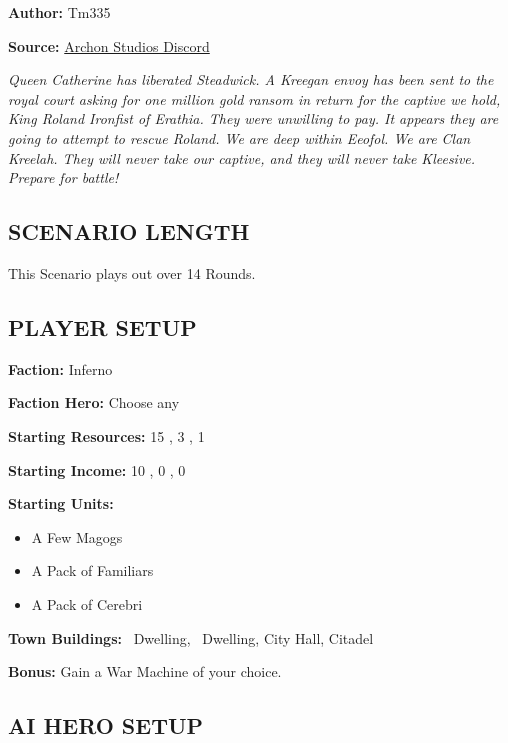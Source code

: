 
\begin{multicols}{2}

\textbf{Author:} Tm335

\textbf{Source:} \href{https://discord.com/channels/740870068178649108/1253923753981902939/1253923753981902939}{Archon Studios Discord}

\textit{Queen Catherine has liberated Steadwick.
A Kreegan envoy has been sent to the royal court asking for one million gold ransom in return for the captive we hold, King Roland Ironfist of Erathia.
They were unwilling to pay.
It appears they are going to attempt to rescue Roland.
We are deep within Eeofol.
We are Clan Kreelah.
They will never take our captive, and they will never take Kleesive.
Prepare for battle!}

\subsection*{\MakeUppercase{Scenario Length}}

This Scenario plays out over 14 Rounds.

\subsection*{\MakeUppercase{Player Setup}}

\textbf{Faction:} Inferno

\textbf{Faction Hero:} Choose any

\textbf{Starting Resources:} 15 , 3 , 1 

\textbf{Starting Income:} 10 , 0 , 0 

\textbf{Starting Units:}

\begin{itemize}
  \item A Few Magogs
  \item A Pack of Familiars
  \item A Pack of Cerebri
\end{itemize}

\textbf{Town Buildings:} \bronze\ Dwelling, \silver\ Dwelling, City Hall, Citadel

\textbf{Bonus:} Gain a War Machine of your choice.

\subsection*{\MakeUppercase{AI Hero Setup}}


\end{multicols}
